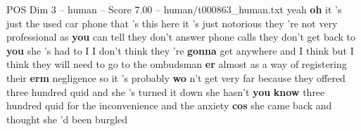 \begin{textsample}{POS Dim 3 – human – Score 7.00 – human/t000863\_human.txt}  \label{ex:f3_pos_016}
yeah \textbf{oh} it 's just the used car phone that 's this here it 's just notorious they 're not very professional as \textbf{you} can tell they don't answer phone calls they don't get back to \textbf{you} she 's had to I I don't think they 're \textbf{gonna} get anywhere and I think but I think they will need to go to the ombudsman \textbf{er} almost as a way of registering their \textbf{erm} negligence so it 's probably \textbf{wo} n't get very far because they offered three hundred quid and she 's turned it down she hasn't \textbf{you} \textbf{know} three hundred quid for the inconvenience and the anxiety \textbf{cos} she came back and thought she 'd been burgled

\end{textsample}
